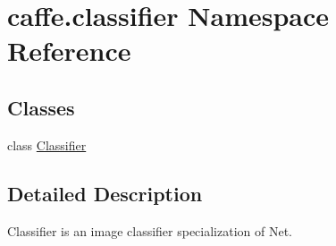 \hypertarget{namespacecaffe_1_1classifier}{}\section{caffe.\+classifier Namespace Reference}
\label{namespacecaffe_1_1classifier}
\subsection*{Classes}
\begin{DoxyCompactItemize}
\item 
class \mbox{\hyperlink{classcaffe_1_1classifier_1_1_classifier}{Classifier}}
\end{DoxyCompactItemize}


\subsection{Detailed Description}
\begin{DoxyVerb}Classifier is an image classifier specialization of Net.
\end{DoxyVerb}
 